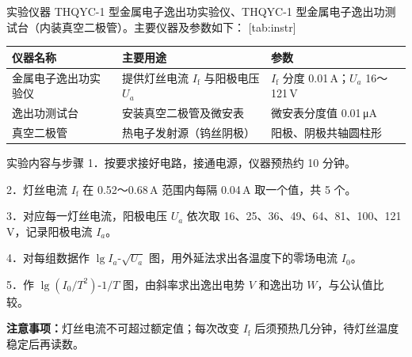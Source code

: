 \documentclass{labreport}
\begin{document}
\begin{labsection}{实验仪器}
THQYC-1 型金属电子逸出功实验仪、THQYC-1 型金属电子逸出功测试台（内装真空二极管）。主要仪器及参数如下：
[tab:instr]{
\begin{tabularx}{\linewidth}{|>{\centering\arraybackslash}p{4.2cm}|>{\centering\arraybackslash}X|>{\centering\arraybackslash}X|}
\hline 仪器名称 & 主要用途 & 参数 \\ \hline
金属电子逸出功实验仪 & 提供灯丝电流 $I_\mathrm{f}$ 与阳极电压 $U_a$ & $I_\mathrm{f}$ 分度 0.01\,A；$U_a$ 16～121\,V \\ \hline
逸出功测试台 & 安装真空二极管及微安表 & 微安表分度值 0.01\,μA \\ \hline
真空二极管 & 热电子发射源（钨丝阴极） & 阳极、阴极共轴圆柱形 \\ \hline
\end{tabularx}}
\end{labsection}

\begin{labsection}{实验内容与步骤}
1．按要求接好电路，接通电源，仪器预热约 10 分钟。\par
2．灯丝电流 $I_\mathrm{f}$ 在 0.52～0.68\,A 范围内每隔 0.04\,A 取一个值，共 5 个。\par
3．对应每一灯丝电流，阳极电压 $U_a$ 依次取 16、25、36、49、64、81、100、121\,V，记录阳极电流 $I_a$。\par
4．对每组数据作 $\lg I_a$-$\sqrt{U_a}$ 图，用外延法求出各温度下的零场电流 $I_0$。\par
5．作 $\lg(I_0/T^2)$-$1/T$ 图，由斜率求出逸出电势 $V$ 和逸出功 $W$，与公认值比较。\par
\textbf{注意事项：}灯丝电流不可超过额定值；每次改变 $I_\mathrm{f}$ 后须预热几分钟，待灯丝温度稳定后再读数。
\end{labsection}
\end{document}
